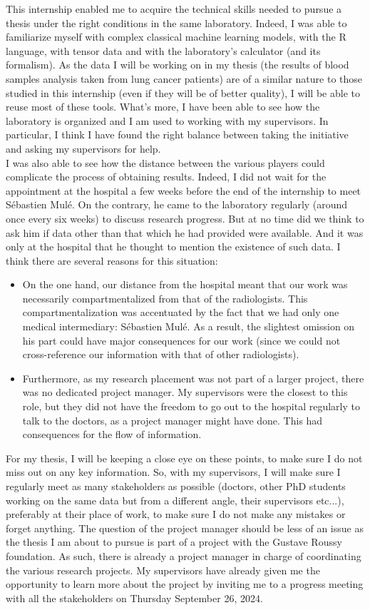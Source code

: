 \documentclass[preprint,12pt]{elsarticle}
\begin{document}
\noindent This internship enabled me to acquire the technical skills needed to pursue a thesis under the right conditions in the same laboratory. Indeed, I was able to familiarize myself with complex classical machine learning models, with the R language, with tensor data and with the laboratory's calculator (and its formalism). As the data I will be working on in my thesis (the results of blood samples analysis taken from lung cancer patients) are of a similar nature to those studied in this internship (even if they will be of better quality), I will be able to reuse most of these tools. What's more, I have been able to see how the laboratory is organized and I am used to working with my supervisors. In particular, I think I have found the right balance between taking the initiative and asking my supervisors for help.\\
\indent I was also able to see how the distance between the various players could complicate the process of obtaining results. Indeed, I did not wait for the appointment at the hospital a few weeks before the end of the internship to meet Sébastien Mulé. On the contrary, he came to the laboratory regularly (around once every six weeks) to discuss research progress. But at no time did we think to ask him if data other than that which he had provided were available. And it was only at the hospital that he thought to mention the existence of such data. I think there are several reasons for this situation:
\begin{itemize}[label = $\bullet$]
    \item On the one hand, our distance from the hospital meant that our work was necessarily compartmentalized from that of the radiologists. This compartmentalization was accentuated by the fact that we had only one medical intermediary: Sébastien Mulé. As a result, the slightest omission on his part could have major consequences for our work (since we could not cross-reference our information with that of other radiologists).
    \item Furthermore, as my research placement was not part of a larger project, there was no dedicated project manager. My supervisors were the closest to this role, but they did not have the freedom to go out to the hospital regularly to talk to the doctors, as a project manager might have done. This had consequences for the flow of information.
\end{itemize}
\indent For my thesis, I will be keeping a close eye on these points, to make sure I do not miss out on any key information. So, with my supervisors, I will make sure I regularly meet as many stakeholders as possible (doctors, other PhD students working on the same data but from a different angle, their supervisors etc...), preferably at their place of work, to make sure I do not make any mistakes or forget anything. The question of the project manager should be less of an issue as the thesis I am about to pursue is part of a project with the Gustave Roussy foundation. As such, there is already a project manager in charge of coordinating the various research projects. My supervisors have already given me the opportunity to learn more about the project by inviting me to a progress meeting with all the stakeholders on Thursday September 26, 2024. \\
\end{document}
